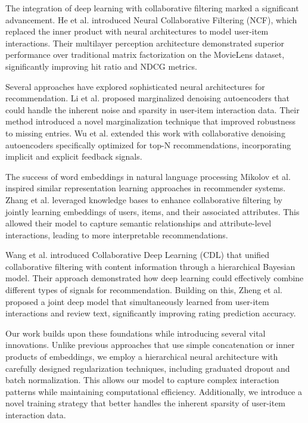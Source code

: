 \documentclass[sigconf]{acmart}
\begin{document}
The integration of deep learning with collaborative filtering marked a significant advancement. He et al. \cite{he2017neural} introduced Neural Collaborative Filtering (NCF), which replaced the inner product with neural architectures to model user-item interactions. Their multilayer perception architecture demonstrated superior performance over traditional matrix factorization on the MovieLens dataset, significantly improving hit ratio and NDCG metrics.

Several approaches have explored sophisticated neural architectures for recommendation. Li et al. \cite{li2015deep} proposed marginalized denoising autoencoders that could handle the inherent noise and sparsity in user-item interaction data. Their method introduced a novel marginalization technique that improved robustness to missing entries. Wu et al. \cite{wu2016collaborative} extended this work with collaborative denoising autoencoders specifically optimized for top-N recommendations, incorporating implicit and explicit feedback signals.

The success of word embeddings in natural language processing Mikolov et al. \cite{mikolov2013distributed} inspired similar representation learning approaches in recommender systems. Zhang et al. \cite{zhang2016collaborative} leveraged knowledge bases to enhance collaborative filtering by jointly learning embeddings of users, items, and their associated attributes. This allowed their model to capture semantic relationships and attribute-level interactions, leading to more interpretable recommendations.

Wang et al. \cite{wang2015collaborative} introduced Collaborative Deep Learning (CDL) that unified collaborative filtering with content information through a hierarchical Bayesian model. Their approach demonstrated how deep learning could effectively combine different types of signals for recommendation. Building on this, Zheng et al. \cite{zheng2017joint} proposed a joint deep model that simultaneously learned from user-item interactions and review text, significantly improving rating prediction accuracy.

Our work builds upon these foundations while introducing several vital innovations. Unlike previous approaches that use simple concatenation or inner products of embeddings, we employ a hierarchical neural architecture with carefully designed regularization techniques, including graduated dropout and batch normalization. This allows our model to capture complex interaction patterns while maintaining computational efficiency. Additionally, we introduce a novel training strategy that better handles the inherent sparsity of user-item interaction data.
\end{document}
